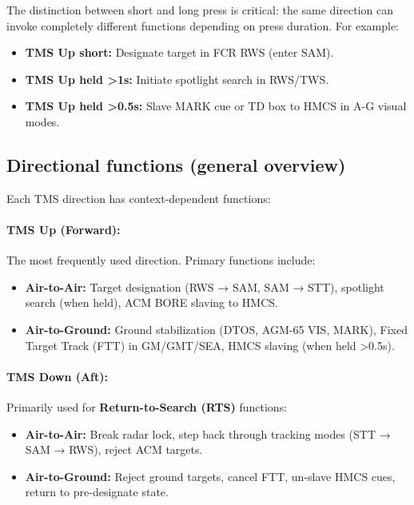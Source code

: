 \documentclass[11pt, a4paper, twoside]{report}
\begin{document}
The distinction between short and long press is critical: the same direction can invoke completely different functions depending on press duration. For example:
\begin{itemize}
    \item \textbf{TMS Up short:} Designate target in FCR RWS (enter SAM).
    \item \textbf{TMS Up held >1s:} Initiate spotlight search in RWS/TWS.
    \item \textbf{TMS Up held >0.5s:} Slave MARK cue or TD box to HMCS in A-G visual modes.
\end{itemize}

\subsection{Directional functions (general overview)}
\label{sec:C3-S1-S2}

Each TMS direction has context-dependent functions:

\paragraph{TMS Up (Forward):}
The most frequently used direction. Primary functions include:
\begin{itemize}
    \item \textbf{Air-to-Air:} Target designation (RWS → SAM, SAM → STT), spotlight search (when held), ACM BORE slaving to HMCS.
    \item \textbf{Air-to-Ground:} Ground stabilization (DTOS, AGM-65 VIS, MARK), Fixed Target Track (FTT) in GM/GMT/SEA, HMCS slaving (when held >0.5s).
\end{itemize}

\paragraph{TMS Down (Aft):}
Primarily used for \textbf{Return-to-Search (RTS)} functions:
\begin{itemize}
    \item \textbf{Air-to-Air:} Break radar lock, step back through tracking modes (STT → SAM → RWS), reject ACM targets.
    \item \textbf{Air-to-Ground:} Reject ground targets, cancel FTT, un-slave HMCS cues, return to pre-designate state.
\end{itemize}
\end{document}
